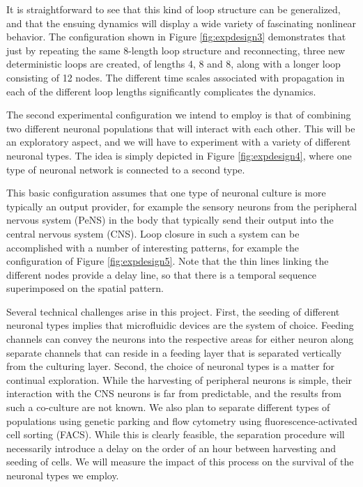 It is straightforward to see that this kind of loop structure can be generalized, and that the ensuing dynamics will display a wide variety of fascinating nonlinear behavior. The configuration shown in Figure \ref{fig:expdesign3} demonstrates that just by repeating the same 8-length loop structure and reconnecting, three new deterministic loops are created, of lengths 4, 8 and 8, along with a longer loop consisting of 12 nodes. The different time scales associated with propagation in each of the different loop lengths significantly complicates the dynamics.

The second experimental configuration we intend to employ is that of combining two different neuronal populations that will interact with each other. This will be an exploratory aspect, and we will have to experiment with a variety of different neuronal types. The idea is simply depicted in Figure \ref{fig:expdesign4}, where one type of neuronal network is connected to a second type.

This basic configuration assumes that one type of neuronal culture is more typically an output provider, for example the sensory neurons from the peripheral nervous system (PeNS) in the body that typically send their output into the central nervous system (CNS). Loop closure in such a system can be accomplished with a number of interesting patterns, for example the configuration of Figure \ref{fig:expdesign5}. Note that the thin lines linking the different nodes provide a delay line, so that there is a temporal sequence superimposed on the spatial pattern.

Several technical challenges arise in this project. First, the seeding of different neuronal types implies that microfluidic devices are the system of choice. Feeding channels can convey the neurons into the respective areas for either neuron along separate channels that can reside in a feeding layer that is separated vertically from the culturing layer. Second, the choice of neuronal types is a matter for continual exploration. While the harvesting of peripheral neurons is simple, their interaction with the CNS neurons is far from predictable, and the results from such a co-culture are not known. We also plan to separate different types of populations using genetic parking and flow cytometry using fluorescence-activated cell sorting (FACS). While this is clearly feasible, the separation procedure will necessarily introduce a delay on the order of an hour between harvesting and seeding of cells. We will measure the impact of this process on the survival of the neuronal types we employ.

